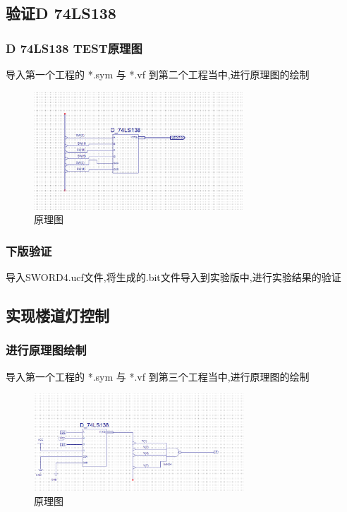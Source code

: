 \documentclass{article}
\begin{document}
\subsection{验证D 74LS138}

\subsubsection{D 74LS138 TEST原理图}

导入第一个工程的 *.sym 与 *.vf 到第二个工程当中,进行原理图的绘制
    \begin{figure}[H]
	\centering
	\includegraphics[width=0.7\textwidth]{5.png}
	\caption{\label{Lab5}原理图}
	\end{figure}

\subsubsection{下版验证}
导入SWORD4.ucf文件,将生成的.bit文件导入到实验版中,进行实验结果的验证


\subsection{实现楼道灯控制}

\subsubsection{进行原理图绘制}
导入第一个工程的 *.sym 与 *.vf 到第三个工程当中,进行原理图的绘制
    \begin{figure}[H]
	\centering
	\includegraphics[width=0.7\textwidth]{7.png}
	\caption{\label{Lab5}原理图}
	\end{figure}
\end{document}
